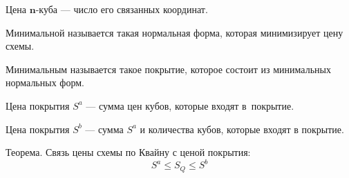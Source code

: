 {\bold Цена $\symbf{n}$-куба} --- число его связанных координат.

{\bold Минимальной} называется такая нормальная форма, которая {\ital минимизирует} цену схемы.

{\bold Минимальным} называется такое покрытие, которое состоит из {\ital минимальных} нормальных форм.

{\bold Цена покрытия} $S^a$ --- сумма цен кубов, которые входят в~покрытие.

{\bold Цена покрытия} $S^b$ --- сумма $S^a$ и количества кубов, которые входят в покрытие.

\begin{theorem}
{\bold Теорема.} Связь цены схемы по Квайну с ценой покрытия:
$$S^a\leq S_Q\leq S^b$$
\end{theorem}

